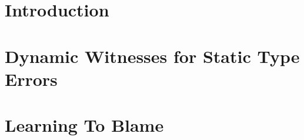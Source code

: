 \documentclass[12pt]{ucsddissertation}
\theoremstyle{plain}%
\theoremstyle{definition}
\begin{document}
\mainmatter



\lstMakeShortInline{|}

\chapter{Introduction}

\chapter{Dynamic Witnesses for Static Type Errors}
\newcommand\toolname{\tool{NanoMaLy}}







%
%
%
%
%
%
%

\chapter{Learning To Blame}
\renewcommand\toolname{\tool{Nate}}









\end{document}
